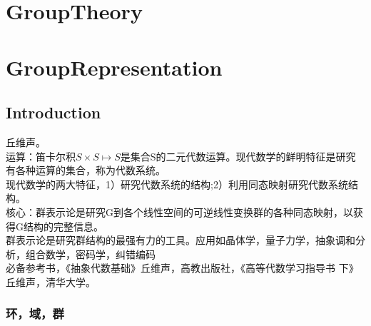 \chapter{GroupTheory}

\chapter{GroupRepresentation}

\section{Introduction}
丘维声。\\
运算：笛卡尔积$S \times S \mapsto S$是集合S的二元代数运算。现代数学的鲜明特征是研究有各种运算的集合，称为代数系统。\\
现代数学的两大特征，1）研究代数系统的结构;2）利用同态映射研究代数系统结构。\\
核心：群表示论是研究G到各个线性空间的可逆线性变换群的各种同态映射，以获得G结构的完整信息。\\
群表示论是研究群结构的最强有力的工具。应用如晶体学，量子力学，抽象调和分析，组合数学，密码学，纠错编码\\
必备参考书，《抽象代数基础》丘维声，高教出版社，《高等代数学习指导书 下》丘维声，清华大学。

\subsection{环，域，群}

